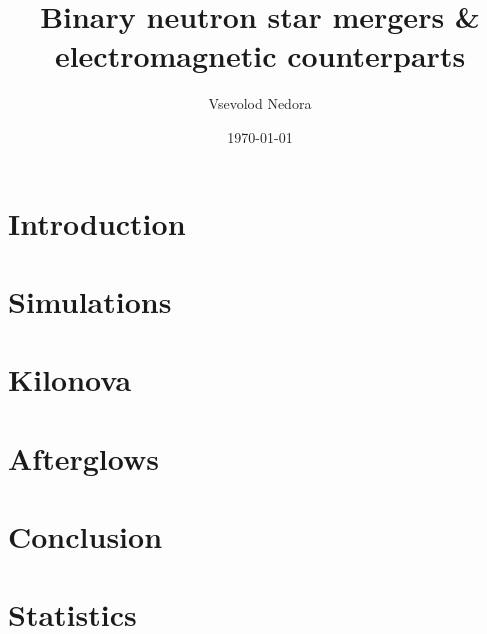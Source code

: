 \documentclass[unknownkeysallowed,aspectratio=169]{beamer} %
\title[BNS mergers \& EM counterparts]{
    Binary neutron star mergers \& 
    electromagnetic counterparts
}
\author[V. Nedora]{Vsevolod Nedora}
\institute[Fridrih Shiller Institute Jena]
\date{\today}
\begin{document}


\begin{frame} %
\titlepage
\end{frame}

\section{Introduction}

\section{Simulations}

%
\section{Kilonova}

\section{Afterglows}

%
\section{Conclusion}


\appendix

\section{Statistics}


\printbibliography[heading=bibintoc]
%
\end{document}
